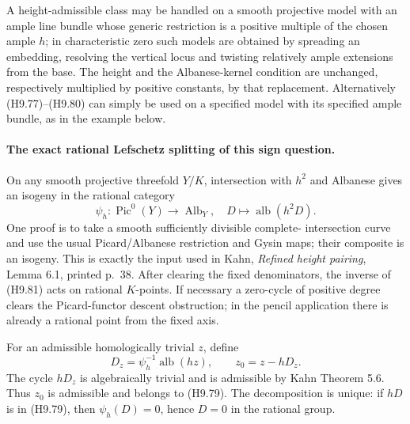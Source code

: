 A height-admissible class may be handled on a smooth projective
model with an ample line bundle whose generic restriction is a
positive multiple of the chosen ample $h$; in characteristic zero
such models are obtained by spreading an embedding, resolving the
vertical locus and twisting relatively ample extensions from the
base. The height and the Albanese-kernel condition are unchanged,
respectively multiplied by positive constants, by that replacement.
Alternatively (H9.77)--(H9.80) can simply be used on a specified
model with its specified ample bundle, as in the example below.

\paragraph{The exact rational Lefschetz splitting of this sign question.}
On any smooth projective threefold $Y/K$, intersection with $h^2$
and Albanese gives an isogeny in the rational category
\[
 \psi_h:\operatorname{Pic}^0(Y)\longrightarrow\operatorname{Alb}_Y,
             \quad D\longmapsto\operatorname{alb}(h^2D).
                                                               \tag{H9.81}
\]
One proof is to take a smooth sufficiently divisible complete-
intersection curve and use the usual Picard/Albanese restriction
and Gysin maps; their composite is an isogeny. This is exactly the
input used in Kahn, \emph{Refined height pairing}, Lemma 6.1,
printed p.~38. After clearing the fixed denominators, the inverse
of (H9.81) acts on rational $K$-points. If necessary a zero-cycle
of positive degree clears the Picard-functor descent obstruction;
in the pencil application there is already a rational point from
the fixed axis.

For an admissible homologically trivial $z$, define
\[
 D_z=\psi_h^{-1}\operatorname{alb}(hz),
       \qquad z_0=z-hD_z.
                                                               \tag{H9.82}
\]
The cycle $hD_z$ is algebraically trivial and is admissible by
Kahn Theorem 5.6. Thus $z_0$ is admissible and belongs to (H9.79).
The decomposition is unique: if $hD$ is in (H9.79), then
$\psi_h(D)=0$, hence $D=0$ in the rational group.

